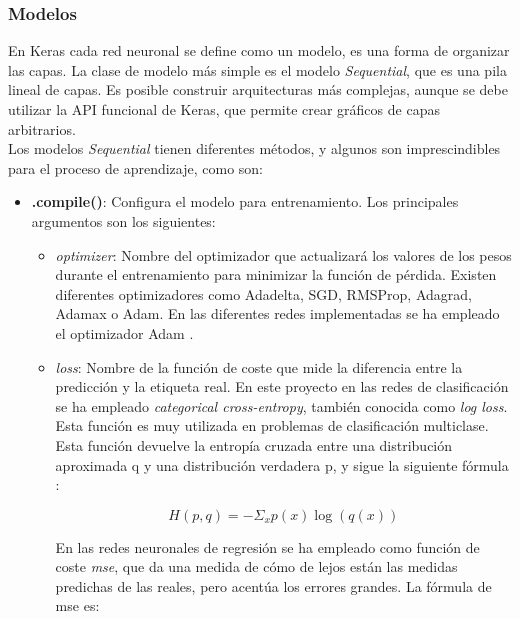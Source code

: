 \subsubsection{Modelos}

En Keras cada red neuronal se define como un modelo, es una forma de organizar las capas. La clase de modelo más simple es el modelo \textit{Sequential}, que es una pila lineal de capas. Es posible construir arquitecturas más complejas, aunque se debe utilizar la API funcional de Keras, que permite crear gráficos de capas arbitrarios.\\

Los modelos \textit{Sequential} tienen diferentes métodos, y algunos son imprescindibles para el proceso de aprendizaje, como son:

\begin{itemize}
    \item \textbf{.compile()}: Configura el modelo para entrenamiento. Los principales argumentos son los siguientes:
    
        \begin{itemize}
            \item \textit{optimizer}: Nombre del optimizador que actualizará los valores de los pesos durante el entrenamiento para minimizar la función de pérdida. Existen diferentes optimizadores como Adadelta, SGD, RMSProp, Adagrad, Adamax o Adam. En las diferentes redes implementadas se ha empleado el optimizador Adam \cite{adam}.
            
            \item \textit{loss}: Nombre de la función de coste que mide la diferencia entre la predicción y la etiqueta real. En este proyecto en las redes de clasificación se ha empleado \textit{categorical cross-entropy}, también conocida como \textit{log loss}. Esta función es muy utilizada en problemas de clasificación multiclase. Esta función devuelve la entropía cruzada entre una distribución aproximada q y una distribución verdadera p, y sigue la siguiente fórmula \cite{ops_theano}:
            
            \begin{equation}\label{eq:categorical_crossentropy}
		    H(p,q)=-\Sigma_{x}p(x)\log(q(x))
		    \end{equation}	
            
            En las redes neuronales de regresión se ha empleado como función de coste \textit{\acrfull{mse}}, que da una medida de cómo de lejos están las medidas predichas de las reales, pero acentúa los errores grandes. La fórmula de \acrshort{mse} es:
            

\end{itemize}
\end{itemize}
